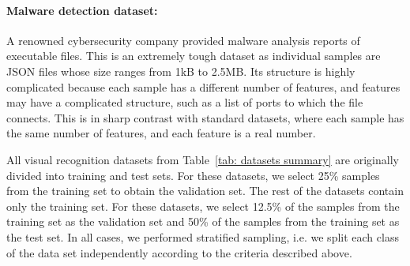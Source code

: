 \paragraph*{Malware detection dataset:}

A renowned cybersecurity company provided malware analysis reports of executable files. This is an extremely tough dataset as individual samples are JSON files whose size ranges from 1kB to 2.5MB. Its structure is highly complicated because each sample has a different number of features, and features may have a complicated structure, such as a list of ports to which the file connects. This is in sharp contrast with standard datasets, where each sample has the same number of features, and each feature is a real number.

All visual recognition datasets from Table~\ref{tab: datasets summary} are originally divided into training and test sets. For these datasets, we select 25\% samples from the training set to obtain the validation set. The rest of the datasets contain only the training set. For these datasets, we select 12.5\% of the samples from the training set as the validation set and 50\% of the samples from the training set as the test set. In all cases, we performed stratified sampling, i.e. we split each class of the data set independently according to the criteria described above.


